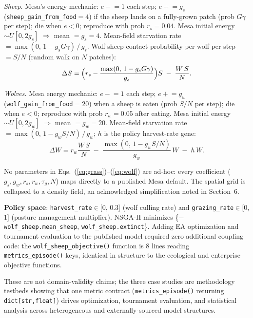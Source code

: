 \documentclass{wscpaperproc}
\begin{document}
\textit{Sheep.} Mesa's energy mechanic: $e \mathrel{-}= 1$ each step;
$e \mathrel{+}= g_s$ (\texttt{sheep\_gain\_from\_food}$=4$) if the sheep
lands on a fully-grown patch (prob $G\gamma$ per step); die when $e<0$;
reproduce with prob $r_s=0.04$. Mesa initial energy $\sim U[0,2g_s]$
$\Rightarrow$ mean $= g_s = 4$. Mean-field starvation rate $=
\max(0,\, 1 - g_s G\gamma)\,/\,g_s$. Wolf-sheep contact probability per
wolf per step $= S/N$ (random walk on $N$ patches):
\begin{equation}
  \Delta S = \Bigl(r_s - \frac{\max(0,\,1-g_s G\gamma)}{g_s}\Bigr)S
             \;-\; \frac{W\,S}{N}.
  \label{eq:sheep}
\end{equation}

\textit{Wolves.} Mesa energy mechanic: $e \mathrel{-}= 1$ each step;
$e \mathrel{+}= g_w$ (\texttt{wolf\_gain\_from\_food}$=20$) when a sheep
is eaten (prob $S/N$ per step); die when $e<0$; reproduce with prob
$r_w=0.05$ after eating. Mesa initial energy $\sim U[0,2g_w]$
$\Rightarrow$ mean $= g_w = 20$. Mean-field starvation rate $=
\max(0,\,1 - g_w S/N)\,/\,g_w$; $h$ is the policy harvest-rate gene:
\begin{equation}
  \Delta W = r_w \frac{W\,S}{N}
             \;-\; \frac{\max(0,\,1-g_w S/N)}{g_w}\,W
             \;-\; h\,W.
  \label{eq:wolf}
\end{equation}

No parameters in Eqs.~(\ref{eq:grass})--(\ref{eq:wolf}) are ad-hoc: every
coefficient ($g_s, g_w, r_s, r_w, \tau_g, N$) maps directly to a published
Mesa default. The spatial grid is collapsed to a density field, an
acknowledged simplification noted in Section~6.

\textbf{Policy space}: \texttt{harvest\_rate}$\in$[0, 0.3] (wolf culling
rate) and \texttt{grazing\_rate}$\in$[0, 1] (pasture management multiplier).
NSGA-II minimizes \{$-$\texttt{wolf\_sheep.mean\_sheep},
\texttt{wolf\_sheep.extinct}\}. Adding EA optimization and tournament
evaluation to the published model required zero additional coupling code:
the \texttt{wolf\_sheep\_objective()} function is 8 lines reading
\texttt{metrics\_episode()} keys, identical in structure to the ecological
and enterprise objective functions.

These are not domain-validity claims; the three case studies are methodology
testbeds showing that one metric contract (\texttt{metrics\_episode()}
returning \texttt{dict[str,float]}) drives optimization, tournament
evaluation, and statistical analysis across heterogeneous and
externally-sourced model structures.
\end{document}
